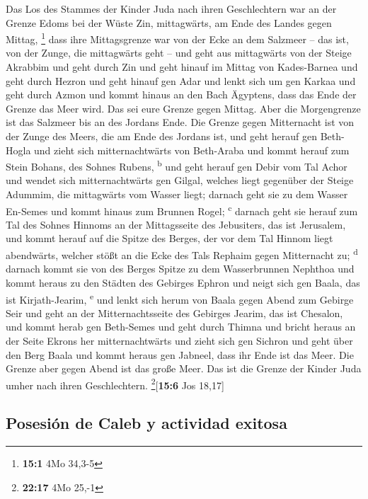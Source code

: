  Das Los des Stammes der Kinder Juda nach ihren
Geschlechtern war an der Grenze Edoms bei der Wüste Zin, mittagwärts, am
Ende des Landes gegen Mittag, \footnote{\textbf{15:1} 4Mo 34,3-5}
 dass ihre Mittagsgrenze war von der Ecke an dem Salzmeer
-- das ist, von der Zunge, die mittagwärts geht --  und
geht aus mittagwärts von der Steige Akrabbim und geht durch Zin und geht
hinauf im Mittag von Kades-Barnea und geht durch Hezron und geht hinauf
gen Adar und lenkt sich um gen Karkaa  und geht durch
Azmon und kommt hinaus an den Bach Ägyptens, dass das Ende der Grenze
das Meer wird. Das sei eure Grenze gegen Mittag.  Aber die
Morgengrenze ist das Salzmeer bis an des Jordans Ende. Die Grenze gegen
Mitternacht ist von der Zunge des Meers, die am Ende des Jordans ist,
 und geht herauf gen Beth-Hogla und zieht sich
mitternachtwärts von Beth-Araba und kommt herauf zum Stein Bohans, des
Sohnes Rubens, \textsuperscript{b}  und geht herauf gen
Debir vom Tal Achor und wendet sich mitternachtwärts gen Gilgal, welches
liegt gegenüber der Steige Adummim, die mittagwärts vom Wasser liegt;
darnach geht sie zu dem Wasser En-Semes und kommt hinaus zum Brunnen
Rogel; \textsuperscript{c}  darnach geht sie herauf zum
Tal des Sohnes Hinnoms an der Mittagsseite des Jebusiters, das ist
Jerusalem, und kommt herauf auf die Spitze des Berges, der vor dem Tal
Hinnom liegt abendwärts, welcher stößt an die Ecke des Tals Rephaim
gegen Mitternacht zu; \textsuperscript{d}  darnach kommt
sie von des Berges Spitze zu dem Wasserbrunnen Nephthoa und kommt heraus
zu den Städten des Gebirges Ephron und neigt sich gen Baala, das ist
Kirjath-Jearim, \textsuperscript{e}  und lenkt sich herum
von Baala gegen Abend zum Gebirge Seir und geht an der Mitternachtsseite
des Gebirges Jearim, das ist Chesalon, und kommt herab gen Beth-Semes
und geht durch Thimna  und bricht heraus an der Seite
Ekrons her mitternachtwärts und zieht sich gen Sichron und geht über den
Berg Baala und kommt heraus gen Jabneel, dass ihr Ende ist das Meer.
 Die Grenze aber gegen Abend ist das große Meer. Das ist
die Grenze der Kinder Juda umher nach ihren Geschlechtern.
\footnote{\textbf{22:17} 4Mo 25,-1}{[}\textbf{15:6} Jos 18,17{]}

\hypertarget{posesiuxf3n-de-caleb-y-actividad-exitosa}{%
\subsection{Posesión de Caleb y actividad
exitosa}\label{posesiuxf3n-de-caleb-y-actividad-exitosa}}

